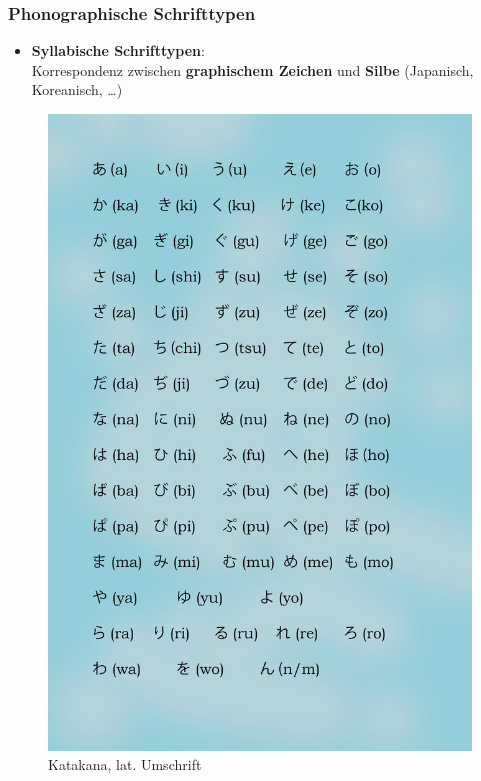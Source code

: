 \begin{frame}
\frametitle{Phonographische Schrifttypen}

\begin{minipage}{.59\textwidth}
\begin{itemize}
	\item \textbf{Syllabische Schrifttypen}: \\
	Korrespondenz zwischen \textbf{graphischem Zeichen} und \textbf{Silbe} (Japanisch, Koreanisch, \dots)
	

\end{itemize}
\end{minipage}\hfill%
\begin{minipage}{.4\textwidth}
	\begin{figure}
		\centering
		
		\includegraphics[scale=.057]{material/05Katakana}
		\caption{Katakana, lat. Umschrift}
	\end{figure}
\end{minipage}

\end{frame}


